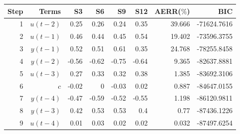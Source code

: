 \begin{tabular}{rrrrrrrr}
Step & Terms & S3 & S6 & S9 & S12 & AERR($\%$) & BIC \\ 
\hline 
1 & $u(t-2)$ & 0.25 & 0.26 & 0.24 & 0.35 & 39.666 & -71624.7616 \\ 
2 & $u(t-1)$ & 0.46 & 0.44 & 0.45 & 0.54 & 19.402 & -73596.3755 \\ 
3 & $y(t-1)$ & 0.52 & 0.51 & 0.61 & 0.35 & 24.768 & -78255.8458 \\ 
4 & $y(t-2)$ & -0.56 & -0.62 & -0.75 & -0.64 & 9.365 & -82637.8881 \\ 
5 & $u(t-3)$ & 0.27 & 0.33 & 0.32 & 0.38 & 1.385 & -83692.3106 \\ 
6 & $c$ & -0.02 & 0 & -0.03 & 0.02 & 0.887 & -84647.0155 \\ 
7 & $y(t-4)$ & -0.47 & -0.59 & -0.52 & -0.55 & 1.198 & -86120.9811 \\ 
8 & $y(t-3)$ & 0.42 & 0.53 & 0.53 & 0.4 & 0.77 & -87436.1226 \\ 
9 & $u(t-4)$ & 0.01 & 0.03 & 0.02 & 0.02 & 0.032 & -87497.6254 \\ 
\hline 
\end{tabular}
